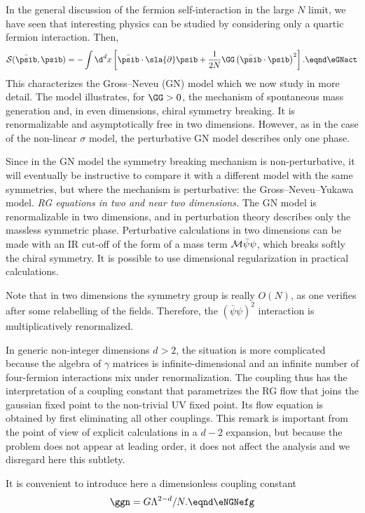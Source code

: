 In the general discussion of the fermion self-interaction in the large
$N$ limit, we have  seen that interesting physics can be
studied by considering only a quartic fermion interaction. Then,\sslbl\ssNGNmod
$${\cal S} (\bar \psib, \psib )= -\int \d^d x \left[ \bar\psib\cdot
\sla{\partial} \psib +\frac{1}{2N}\GG\left(\bar\psib\cdot \psib \right)^2 \right].\eqnd\eGNact $$
This characterizes the Gross--Neveu (GN) model which we now study in more detail.
The model illustrates, for $\GG>0$, the mechanism of spontaneous mass
generation and, in even dimensions, chiral symmetry breaking.
It is renormalizable and asymptotically free in two dimensions.
However, as in the case of the non-linear $\sigma$ model, the perturbative
GN model describes only one phase.  \par
Since in the GN model the symmetry breaking mechanism is non-perturbative,
it will eventually be instructive to compare it with a different model
with the same symmetries, but where the mechanism is perturbative: the
Gross--Neveu--Yukawa model.
%
\smallskip
{\it RG equations in two and near two dimensions.} The GN model is renormalizable in two dimensions, and in perturbation
theory describes only the massless symmetric phase.
Perturbative calculations in two dimensions can be made with an IR cut-off
of the form of a mass term ${\cal M}\bar\psi\psi$, which breaks softly the chiral
symmetry. It is possible to use dimensional regularization in
practical calculations. \par
Note that in two dimensions the symmetry group
is really $O( N)$, as one verifies after some relabelling of the
fields. Therefore, the $(\bar \psi \psi)^2$ interaction is
multiplicatively renormalized. \par
In generic non-integer dimensions $d>2$, the situation is more complicated because the algebra of $\gamma$ matrices is infinite-dimensional and an infinite number of four-fermion interactions mix under renormalization. The coupling \eqns{\eNGNefg} thus has the interpretation of
a coupling constant that parametrizes the RG flow that joins the gaussian fixed point to the non-trivial UV fixed point.
 Its flow equation is obtained by first eliminating all other couplings.
This remark is important from the point of view of explicit calculations  in a $d-2$ expansion, but because the problem does not appear at leading order, it does not affect the analysis and we  disregard here this subtlety.\par
It is convenient to introduce here a
dimensionless coupling constant
$$\ggn=G\Lambda^{2-d}/N. \eqnd\eNGNefg $$
